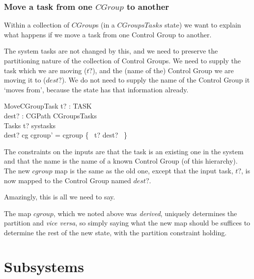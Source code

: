 \documentclass[a4paper,twoside,12pt]{article}
\begin{document}
\subsubsection*{Move a task from one $CGroup$ to another}

Within a collection of $CGroup$s (in a $CGroupsTasks$ state) we want to explain what happens if we move a task from one Control Group to another.

The system tasks are not changed by this, and we need to preserve the partitioning nature of the collection of Control Groups. We need to supply the task which we are moving ($t?$), and the (name of the) Control Group we are moving it to ($dest?$). We do not need to supply the name of the Control Group it `moves from', because the state has that information already.

\begin{schema}{MoveCGroupTask}
t? : TASK \\
dest? : CGPath
\also
\Delta CGroupsTasks \\
\Xi Tasks 
\where
t? \in systasks \\
dest? \in \dom cg
\also
cgroup' = cgroup \oplus \{ ~t? \mapsto dest? ~\}
\end{schema}
The constraints on the inputs are that the task is an existing one in the system and that the name is the name of a known Control Group (of this hierarchy). The new $cgroup$ map is the same as the old one, except that the input task, $t?$, is now mapped to the Control Group named $dest?$.

Amazingly, this is all we need to say.  

The map $cgroup$, which we noted above was \emph{derived}, uniquely determines the partition and \emph{vice versa}, so simply saying what the new map should be suffices to determine the rest of the new state, with the partition constraint holding.

\section{Subsystems}
\end{document}
